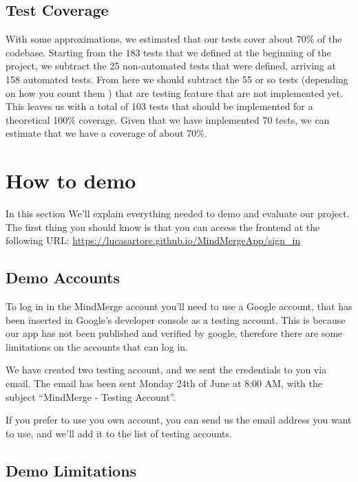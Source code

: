 \documentclass{article}
\begin{document}
\subsection{Test Coverage}

With some approximations, we estimated that our tests cover about 70\% of the codebase.
\newline
Starting from the 183 tests that we defined at the beginning of the project, we subtract the 25 non-automated
tests that were defined, arriving at 158 automated tests.
\newline
From here we should subtract the 55 or so tests (depending on how you count them ) that
are testing feature that are not implemented yet. This leaves us with a total of 103 tests that should be implemented 
for a theoretical 100\% coverage.
\newline
Given that we have implemented 70 tests, we can estimate that we have a coverage of about 70\%.

\section{How to demo}
In this section We'll explain everything needed to demo and evaluate our project.
The first thing you should know is that you can access the frontend at the following URL: \url{https://lucasartore.github.io/MindMergeApp/sign_in}
\subsection{Demo Accounts}

To log in in the MindMerge account you'll need to use a Google account, that has been inserted in Google's developer console as a testing account.
This is because our app has not been published and verified by google, therefore there are some limitations on the accounts that can log in.

We have created two testing account, and we sent the credentials to you via email.
The email has been sent Monday 24th of June at 8:00 AM, with the subject ``MindMerge - Testing Account''.

If you prefer to use you own account, you can send us the email address you want to use, and we'll add it to the list of testing accounts.

\subsection{Demo Limitations}
\end{document}
